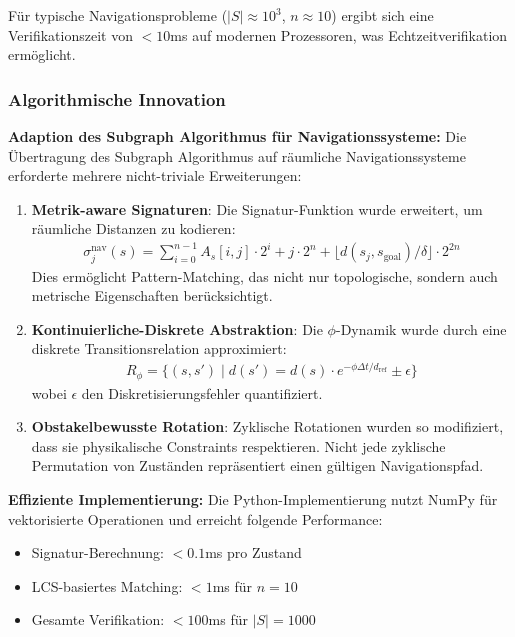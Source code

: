 ﻿\documentclass[a4paper,12pt]{article}
\theoremstyle{definition}
\begin{document}
Für typische Navigationsprobleme ($|S| \approx 10^3$, $n \approx 10$) ergibt sich eine Verifikationszeit von $< 10$ms auf modernen Prozessoren, was Echtzeitverifikation ermöglicht.

\subsubsection{Algorithmische Innovation}

\textbf{Adaption des Subgraph Algorithmus für Navigationssysteme:}
Die Übertragung des Subgraph Algorithmus auf räumliche Navigationssysteme erforderte mehrere nicht-triviale Erweiterungen:

\begin{enumerate}
	\item \textbf{Metrik-aware Signaturen}: Die Signatur-Funktion wurde erweitert, um räumliche Distanzen zu kodieren:
	\begin{align}
		\sigma_j^{\text{nav}}(s) = \sum_{i=0}^{n-1} A_s[i,j] \cdot 2^i + j \cdot 2^n + \lfloor d(s_j, s_{\text{goal}}) / \delta \rfloor \cdot 2^{2n}
	\end{align}
	Dies ermöglicht Pattern-Matching, das nicht nur topologische, sondern auch metrische Eigenschaften berücksichtigt.
	
	\item \textbf{Kontinuierliche-Diskrete Abstraktion}: Die $\phi$-Dynamik wurde durch eine diskrete Transitionsrelation approximiert:
	\begin{align}
		R_{\phi} = \{(s, s') \mid d(s') = d(s) \cdot e^{-\phi \Delta t / d_{\text{ref}}} \pm \epsilon\}
	\end{align}
	wobei $\epsilon$ den Diskretisierungsfehler quantifiziert.
	
	\item \textbf{Obstakelbewusste Rotation}: Zyklische Rotationen wurden so modifiziert, dass sie physikalische Constraints respektieren. Nicht jede zyklische Permutation von Zuständen repräsentiert einen gültigen Navigationspfad.
\end{enumerate}

\textbf{Effiziente Implementierung:}
Die Python-Implementierung nutzt NumPy für vektorisierte Operationen und erreicht folgende Performance:

\begin{itemize}
	\item Signatur-Berechnung: $< 0.1$ms pro Zustand
	\item LCS-basiertes Matching: $< 1$ms für $n = 10$
	\item Gesamte Verifikation: $< 100$ms für $|S| = 1000$
\end{itemize}
\end{document}
